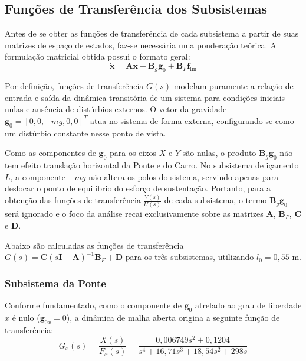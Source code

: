 \documentclass{ppgeesa}
\begin{document}
\subsection{Funções de Transferência dos Subsistemas}

Antes de se obter as funções de transferência de cada subsistema a partir de suas matrizes de espaço de estados, faz-se necessária uma ponderação teórica. A formulação matricial obtida possui o formato geral:
\begin{equation*}
    \dot{\mathbf{x}} = \mathbf{A}\mathbf{x} + \mathbf{B}_g\mathbf{g}_0 + \mathbf{B}_F\mathbf{f}_{\text{lin}}
\end{equation*}

Por definição, funções de transferência $G(s)$ modelam puramente a relação de entrada e saída da dinâmica transitória de um sistema para condições iniciais nulas e ausência de distúrbios externos. O vetor da gravidade $\mathbf{g}_0 = [0, 0, -mg, 0, 0]^T$ atua no sistema de forma externa, configurando-se como um distúrbio constante nesse ponto de vista. 

Como as componentes de $\mathbf{g}_0$ para os eixos $X$ e $Y$ são nulas, o produto $\mathbf{B}_g\mathbf{g}_0$ não tem efeito translação horizontal da Ponte e do Carro. No subsistema de içamento $L$, a componente $-mg$ não altera os polos do sistema, servindo apenas para deslocar o ponto de equilíbrio do esforço de sustentação. Portanto, para a obtenção das funções de transferência $\frac{Y(s)}{U(s)}$ de cada subsistema, o termo $\mathbf{B}_g\mathbf{g}_0$ será ignorado e o foco da análise recai exclusivamente sobre as matrizes $\mathbf{A}$, $\mathbf{B}_F$, $\mathbf{C}$ e $\mathbf{D}$.

Abaixo são calculadas as funções de transferência $G(s) = \mathbf{C}(s\mathbf{I} - \mathbf{A})^{-1}\mathbf{B}_F + \mathbf{D}$ para os três subsistemas, utilizando $l_0 = 0{,}55$ \si{m}.

\subsubsection{Subsistema da Ponte}
Conforme fundamentado, como o componente de $\mathbf{g}_0$ atrelado ao grau de liberdade $x$ é nulo ($\mathbf{g}_{0x} = 0$), a dinâmica de malha aberta origina a seguinte função de transferência:
\begin{equation}
    G_x(s) = \frac{X(s)}{F_x(s)} = \frac{0{,}006749 s^2 + 0{,}1204}{s^4 + 16{,}71 s^3 + 18{,}54 s^2 + 298 s}
\end{equation}
\end{document}
